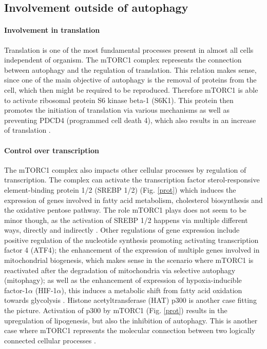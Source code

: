 \documentclass[12pt]{article} %
\begin{document}
\begin{linenumbers*}
\subsection{Involvement outside of autophagy}
\paragraph{Involvement in translation} 
Translation is one of the most fundamental processes present in almost all cells independent of organism. The mTORC1 complex represents the connection between autophagy and the regulation of translation. This relation makes sense, since one of the main objective of autophagy is the removal of proteins from the cell, which then might be required to be reproduced. Therefore mTORC1 is able to activate ribosomal protein S6 kinase beta-1 (S6K1). This protein then promotes the initiation of translation via various mechanisms as well as preventing PDCD4 (programmed cell death 4), which also results in an increase of translation \citep{Sciarretta2018}.

\paragraph{Control over transcription}
The mTORC1 complex also impacts other cellular processes by regulation of transcription. The complex can activate the transcription factor sterol-responsive element-binding protein 1/2 (SREBP 1/2) (Fig. \ref{prot}) which induces the expression of genes involved in fatty acid metabolism, cholesterol biosynthesis and the oxidative pentose pathway. The role mTORC1 plays does not seem to be minor though, as the activation of SREBP 1/2 happens via multiple different ways, directly and indirectly \citep{Sciarretta2018}. Other regulations of gene expression include positive regulation of the nucleotide synthesis promoting activating transcription factor 4 (ATF4); the enhancement of the expression of multiple genes involved in mitochondrial biogenesis, which makes sense in the scenario where mTORC1 is reactivated after the degradation of mitochondria via selective autophagy (mitophagy); as well as the enhancement of expression of hypoxia-inducible factor-1$\alpha$ (HIF-1$\alpha$), this induces a metabolic shift from fatty acid oxidation towards glycolysis \citep{Sciarretta2018}.
Histone acetyltransferase (HAT) p300 is another case fitting the picture. Activation of p300 by mTORC1 (Fig. \ref{prot}) results in the upregulation of lipogenesis, but also the inhibition of autophagy. This is another case where mTORC1 represents the molecular connection between two logically connected cellular processes \citep{Wan2017}.


\end{linenumbers*}
\end{document}
